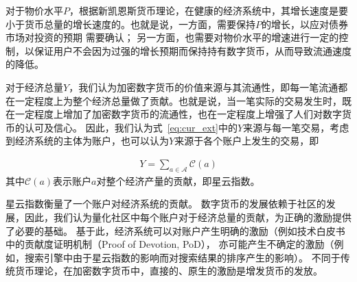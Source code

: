 对于物价水平$P$，根据新凯恩斯货币理论，在健康的经济系统中，其增长速度是要小于货币总量的增长速度的。也就是说，一方面，需要保持$P$的增长，以应对债券市场对投资的预期{\color{red} 需要确认}；
另一方面，也需要对物价水平的增速进行一定的控制，以保证用户不会因为过强的增长预期而保持持有数字货币，从而导致流通速度的降低。

对于经济总量$Y$，我们认为加密数字货币的价值来源与其流通性，即每一笔流通都在一定程度上为整个经济总量做了贡献。也就是说，当一笔实际的交易发生时，既在一定程度上增加了加密数字货币的流通性，也在一定程度上增强了人们对数字货币的认可及信心。
因此，我们认为式~\ref{eq:cur_ext}中的$Y$来源与每一笔交易，考虑到经济系统的主体为账户，也可以认为$Y$来源于各个账户上发生的交易，即

\begin{align}
Y=\sum_{a\in \mathcal{A}} \mathcal{C}(a)
\end{align}
\noindent 其中$\mathcal{C}(a)$表示账户$a$对整个经济产量的贡献，即星云指数。

星云指数衡量了一个账户对经济系统的贡献。
数字货币的发展依赖于社区的发展，因此，我们认为量化社区中每个账户对于经济总量的贡献，为正确的激励提供了必要的基础。
基于此，经济系统可以对账户产生明确的激励（例如技术白皮书中的贡献度证明机制（Proof of Devotion, PoD），
亦可能产生不确定的激励（例如，搜索引擎中由于星云指数的影响而对搜索结果的排序产生的影响）。
不同于传统货币理论，在加密数字货币中，直接的、原生的激励是增发货币的发放。




\begin{comment}

\subsection{经济激励模型}
完整的讨论经济激励模型，超出了本文的范围，然而，考虑到星云指数可能产生的激励效应，有必要对星云指数之后的经济激励给出必要的说明。

星云指数衡量了一个账户对经济系统的贡献，基于此，经济系统可以对账户产生明确的激励（例如技术白皮书中的贡献度证明机制（Proof of Devotion, PoD），
亦可能产生不确定的激励（例如，搜索引擎中由于星云指数的影响而对搜索结果的排序产生的影响）。在加密数字货币中，直接的、原生的激励是增发货币的发放。

我们认为，加密数字货币的最根本的价值来源于流通，即在更多的交易中产生更多的价值

根据式~\ref{eq:currency}

当社区用户产生价值增幅大于星云币增发幅度时，星云币会对应升值或者星云币流通性增加，即用户交易频率增加，从而达到新的平衡，反之亦然。
因此在计算星云经济系统的产出时，我们采用星云指数作为衡量指标，同时我们希望该指标能够促进星云币流通速度的增加。

星云指数的物理意义是{\textbf 用户对经济系统增长的贡献}。更进一步的，所有用户的星云指数的总和，应该与经济体的整体价值正相关{\color{red} xxx}.
\end{comment}
